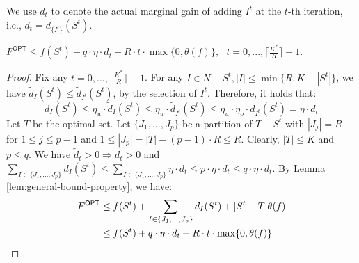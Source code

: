 We use $d_t$ to denote the actual marginal gain of adding $I^t$ at the $t$-th iteration, i.e., $d_t = {d}_{\{I^t\}}(S^{t})$. 


\begin{lemma} \label{lem:bounds on f(S^t) in R-step}
$F^{\textsf{OPT}} \leq f(S^t) + q \cdot \eta \cdot d_{t} + R \cdot t \cdot \max \{ 0, \theta(f) \}, ~~~ t = 0, ..., {\lceil \frac{K^*}{R} \rceil} - 1$.
\end{lemma}
\begin{proof}
Fix any $t = 0, ...,  \lceil \frac{K^*}{R} \rceil - 1$. For any $I \in N - S^t, |I| \leq \min \{ R, K - |S^t| \}$, we have $\tilde{d}_{I}(S^{t}) \leq \tilde{d}_{I^t}(S^{t})$, by the selection of $I^t$. Therefore, it holds that:
\[ d_{I}(S^t) \leq \eta_u \cdot \tilde{d}_{I}(S^{t}) \leq \eta_u \cdot \tilde{d}_{I^t}(S^{t}) \leq \eta_u \cdot \eta_o \cdot {d}_{I^t}(S^{t}) = \eta \cdot d_t \]
Let $T$ be the optimal set. Let $\{ J_1, ..., J_p \}$ be a partition of $T - S^t$ with $|J_j| = R$ for $1 \leq j \leq p-1$ and $1 \leq |J_p| = |T| - (p-1) \cdot R \leq R$. Clearly, $|T| \leq K$ and $p \leq q$. 
We have $\tilde{d}_t > 0 \Rightarrow d_t > 0$ and $\sum_{I \in \{ J_1, ..., J_p \}}{d_{I}(S^t)} \leq \sum_{I \in \{ J_1, ..., J_p \}}{\eta \cdot d_t} \leq p \cdot \eta \cdot d_t \leq q \cdot \eta \cdot d_t$. By Lemma \ref{lem:general-bound-property}, we have:
\begin{align*}
    F^{\textsf{OPT}} &\leq f(S^t) + \sum_{I \in \{ J_1, \ldots, J_p \}}{d_{I}(S^t)} + |S^t-T| \theta(f) \\
    &\leq f(S^t) + q \cdot \eta \cdot d_{t} + R \cdot t \cdot \max \{ 0, \theta(f) \} \qedhere
\end{align*}
\end{proof}

